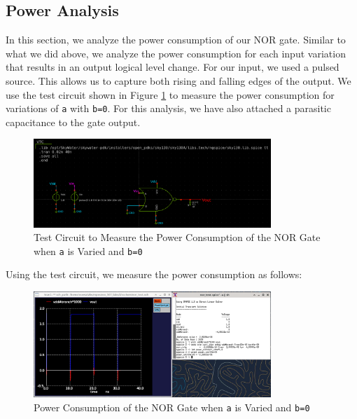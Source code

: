 \documentclass{article}
\begin{document}
	\subsection{Power Analysis}
	
	In this section, we analyze the power consumption of our NOR gate. Similar to what we did above, we analyze the power consumption for each input variation that results in an output logical level change. For our input, we used a pulsed source. This allows us to capture both rising and falling edges of the output. We use the test circuit shown in Figure \ref{fig::nor_power_test_sweep_va} to measure the power consumption for variations of \texttt{a} with \texttt{b=0}. For this analysis, we have also attached a parasitic capacitance to the gate output.
	
	\begin{figure}[H]
		\centerline{\includegraphics[width=0.8\textwidth]{nor_power_test_sweep_va.png}}
		\caption{Test Circuit to Measure the Power Consumption of the NOR Gate when \texttt{a} is Varied and \texttt{b=0}}
		\label{fig::nor_power_test_sweep_va}
	\end{figure}
	
	\noindent Using the test circuit, we measure the power consumption as follows:
	
	\begin{figure}[H]
		\centerline{\includegraphics[width=0.8\textwidth]{nor_power_sweep_va.png}}
		\caption{Power Consumption of the NOR Gate when \texttt{a} is Varied and \texttt{b=0}}
		\label{fig::nor_power_sweep_va}
	\end{figure}
	
\end{document}
